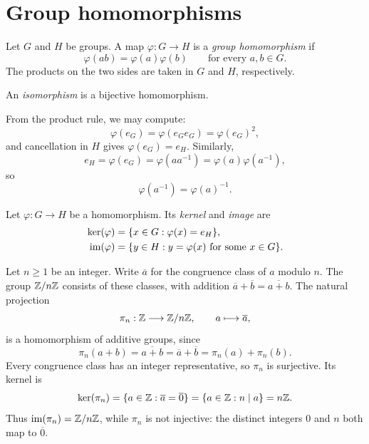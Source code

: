 \documentclass[reqno,11pt]{amsart}
\begin{document}
\section{Group homomorphisms}

\begin{define}[Homomorphism]
	Let $G$ and $H$ be groups. A map $\varphi:G\to H$ is a \emph{group
		homomorphism} if
	\begin{equation}
		\varphi(ab)=\varphi(a)\varphi(b)
		\qquad\text{for every }a,b\in G.
	\end{equation}
	The products on the two sides are taken in $G$ and $H$, respectively.

	An \emph{isomorphism} is a bijective homomorphism.
\end{define}

From the product rule, we may compute:
\[
\varphi(e_G)=\varphi(e_Ge_G)=\varphi(e_G)^2,
\]
and cancellation in $H$ gives $\varphi(e_G)=e_H$. Similarly,
\[
e_H=\varphi(e_G)=\varphi(aa^{-1})
=\varphi(a)\varphi(a^{-1}),
\]
so
\begin{equation}
	\varphi(a^{-1})=\varphi(a)^{-1}.
\end{equation}

\begin{define}
	Let $\varphi:G\to H$ be a homomorphism. Its \emph{kernel} and \emph{image}
	are
	\begin{align}
		\ker(\varphi)&=\{x\in G:\varphi(x)=e_H\},\\
		\operatorname{im}(\varphi)&=\{y\in H:y=\varphi(x)\text{ for some }x\in G\}.
	\end{align}
\end{define}

\begin{example}
Let $n\geq1$ be an integer. Write $\overline a$ for the congruence class
of $a$ modulo $n$. The group $\mathbb{Z}/n\mathbb{Z}$ consists of these classes, with
addition $\overline a+\overline b=\overline{a+b}$.
The natural projection
\begin{equation}
  \pi_n:\mathbb{Z}\longrightarrow\mathbb{Z}/n\mathbb{Z},\qquad a\longmapsto\overline a,
\end{equation}
is a homomorphism of additive groups, since
\[
  \pi_n(a+b)=\overline{a+b}=\overline a+\overline b
  =\pi_n(a)+\pi_n(b).
\]
Every congruence class has an integer representative, so $\pi_n$ is
surjective. Its kernel is
\[
  \ker(\pi_n)=\{a\in\mathbb{Z}:\overline a=\overline0\}
  =\{a\in\mathbb{Z}:n\mid a\}=n\mathbb{Z}.
\]
Thus $\operatorname{im}(\pi_n)=\mathbb{Z}/n\mathbb{Z}$, while $\pi_n$ is not injective:
the distinct integers $0$ and $n$ both map to $\overline0$.
\end{example}
\end{document}
